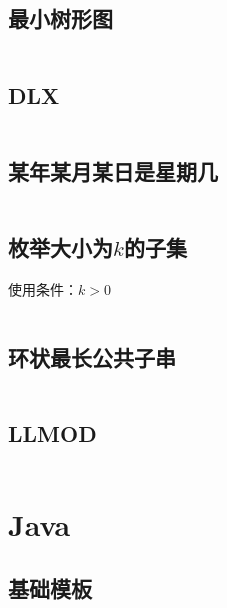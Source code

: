 \documentclass[landscape, oneside, a4paper, cs4size]{book}
\newcommand{\cppcode}[1]{
	\inputminted[mathescape,
	frame=lines,linenos]{cpp}{source/#1}
}
\newcommand{\javacode}[1]{
	\inputminted[mathescape,
	frame=lines,linenos]{java}{source/#1}
}
\begin{document}
\begin{multicols}{2}
\begin{spacing}{0.8}
\subsection{最小树形图}

\cppcode{miscellany/mintreegraph.cpp}


\subsection{DLX}

\cppcode{miscellany/DLX.cpp}






\subsection{某年某月某日是星期几}


\cppcode{miscellany/what-day-is-today.cpp}


\subsection{枚举大小为$k$的子集}


使用条件：$k > 0$


\cppcode{miscellany/subset-of-size-k.cpp}


\subsection{环状最长公共子串}


\cppcode{miscellany/cyclic-longest-common-string.cpp}


\subsection{LLMOD}


\cppcode{miscellany/LLMOD.cpp}






\section{Java}
\subsection{基础模板}
\javacode{template.java}



		\end{spacing}
	\end{multicols}
\end{document}
